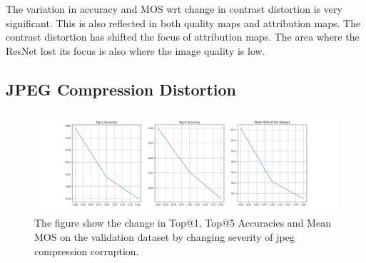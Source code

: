 \documentclass[10pt,twocolumn,letterpaper]{article}
\begin{document}
The variation in accuracy and MOS wrt change in contrast distortion is very significant. This is also reflected in both quality maps and attribution maps. The contrast distortion has shifted the focus of attribution maps. The area where the ResNet lost its focus is also where the image quality is low.

\subsection{JPEG Compression Distortion}
\begin{figure}[!ht]
	\centering
	\includegraphics[width=1.\columnwidth]{Images/jpeg_compression.png}
	\caption{The figure show the change in Top@1, Top@5 Accuracies and Mean MOS on the validation dataset by changing severity of jpeg compression corruption.}
\end{figure}
\end{document}
